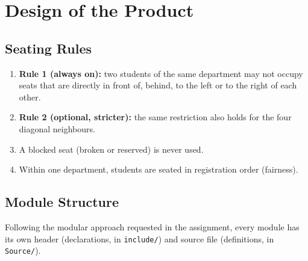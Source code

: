 \documentclass[12pt,a4paper]{report}
\begin{document}
\chapter{Design of the Product}

\section{Seating Rules}
\begin{enumerate}
  \item \textbf{Rule 1 (always on):} two students of the same department may not occupy seats that are directly in front of, behind, to the left or to the right of each other.
  \item \textbf{Rule 2 (optional, stricter):} the same restriction also holds for the four diagonal neighbours.
  \item A blocked seat (broken or reserved) is never used.
  \item Within one department, students are seated in registration order (fairness).
\end{enumerate}

\section{Module Structure}
Following the modular approach requested in the assignment, every module has its own header (declarations, in \texttt{include/}) and source file (definitions, in \texttt{Source/}).
\end{document}

